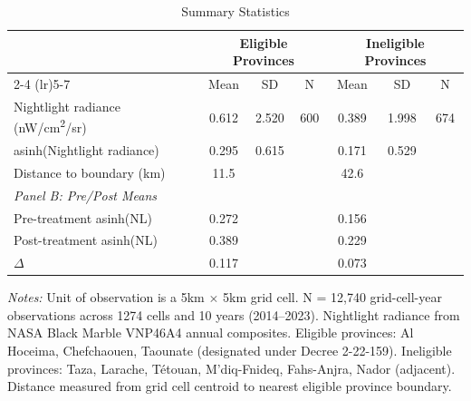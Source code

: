 \begin{table}[H]
\centering
\caption{Summary Statistics}
\begin{threeparttable}
\begin{tabular}{lcccccc}
\toprule
 & \multicolumn{3}{c}{Eligible Provinces} & \multicolumn{3}{c}{Ineligible Provinces} \\
\cmidrule(lr){2-4} \cmidrule(lr){5-7}
 & Mean & SD & N & Mean & SD & N \\
\midrule
Nightlight radiance (nW/cm\textsuperscript{2}/sr) & 0.612 & 2.520 & 600 & 0.389 & 1.998 & 674 \\
asinh(Nightlight radiance) & 0.295 & 0.615 & & 0.171 & 0.529 & \\
Distance to boundary (km) & 11.5 & & & 42.6 & & \\
\midrule
\multicolumn{7}{l}{\textit{Panel B: Pre/Post Means}} \\
Pre-treatment asinh(NL) & 0.272 & & & 0.156 & & \\
Post-treatment asinh(NL) & 0.389 & & & 0.229 & & \\
$\Delta$ & 0.117 & & & 0.073 & & \\
\bottomrule
\end{tabular}
\begin{tablenotes}[flushleft]
\small
\item \textit{Notes:} Unit of observation is a 5km $\times$ 5km grid cell. N = 12,740 grid-cell-year observations across 1274 cells and 10 years (2014--2023). Nightlight radiance from NASA Black Marble VNP46A4 annual composites. Eligible provinces: Al Hoceima, Chefchaouen, Taounate (designated under Decree 2-22-159). Ineligible provinces: Taza, Larache, T\'etouan, M'diq-Fnideq, Fahs-Anjra, Nador (adjacent). Distance measured from grid cell centroid to nearest eligible province boundary.
\end{tablenotes}
\end{threeparttable}
\label{tab:summary}
\end{table}

